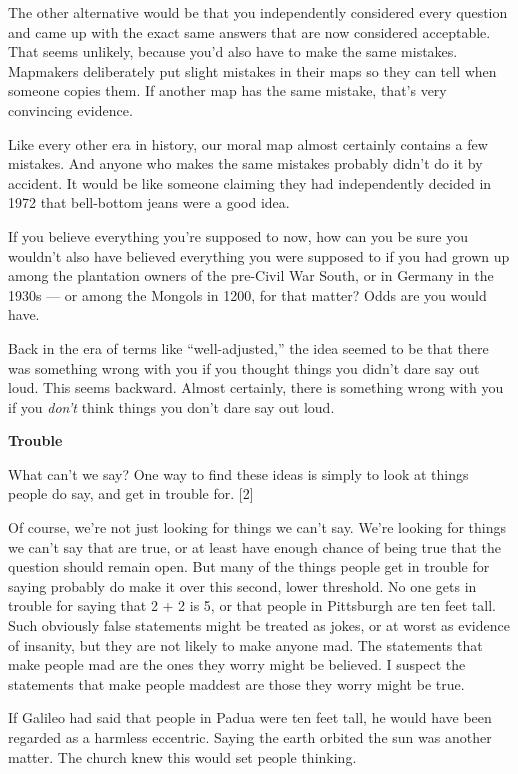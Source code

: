 The other alternative would be that you independently considered every
question and came up with the exact same answers that are now considered
acceptable. That seems unlikely, because you'd also have to make the
same mistakes. Mapmakers deliberately put slight mistakes in their maps
so they can tell when someone copies them. If another map has the same
mistake, that's very convincing evidence.

Like every other era in history, our moral map almost certainly contains
a few mistakes. And anyone who makes the same mistakes probably didn't
do it by accident. It would be like someone claiming they had
independently decided in 1972 that bell-bottom jeans were a good idea.

If you believe everything you're supposed to now, how can you be sure
you wouldn't also have believed everything you were supposed to if you
had grown up among the plantation owners of the pre-Civil War South, or
in Germany in the 1930s --- or among the Mongols in 1200, for that
matter? Odds are you would have.

Back in the era of terms like ``well-adjusted,'' the idea seemed to be
that there was something wrong with you if you thought things you didn't
dare say out loud. This seems backward. Almost certainly, there is
something wrong with you if you \emph{don't} think things you don't dare
say out loud.

\textbf{Trouble}

What can't we say? One way to find these ideas is simply to look at
things people do say, and get in trouble for. {[}2{]}

Of course, we're not just looking for things we can't say. We're looking
for things we can't say that are true, or at least have enough chance of
being true that the question should remain open. But many of the things
people get in trouble for saying probably do make it over this second,
lower threshold. No one gets in trouble for saying that 2 + 2 is 5, or
that people in Pittsburgh are ten feet tall. Such obviously false
statements might be treated as jokes, or at worst as evidence of
insanity, but they are not likely to make anyone mad. The statements
that make people mad are the ones they worry might be believed. I
suspect the statements that make people maddest are those they worry
might be true.

If Galileo had said that people in Padua were ten feet tall, he would
have been regarded as a harmless eccentric. Saying the earth orbited the
sun was another matter. The church knew this would set people thinking.

